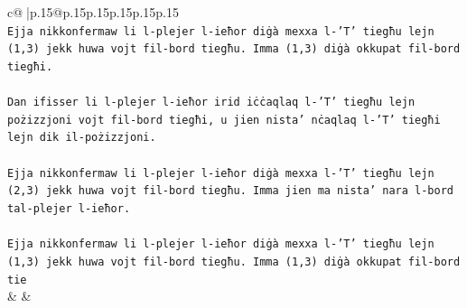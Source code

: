 \documentclass{article}
\begin{document}
{\begin{supertabular}{c@{$\;$}|p{.15\linewidth}@{}p{.15\linewidth}p{.15\linewidth}p{.15\linewidth}p{.15\linewidth}p{.15\linewidth}}
{{{\\ 
\texttt{Ejja nikkonfermaw li l{-}plejer l{-}ieħor diġà mexxa l{-}'T' tiegħu lejn (1,3) jekk huwa vojt fil{-}bord tiegħu. Imma (1,3) diġà okkupat fil{-}bord tiegħi.} \\
\\ 
\texttt{Dan ifisser li l{-}plejer l{-}ieħor irid iċċaqlaq l{-}'T' tiegħu lejn pożizzjoni vojt fil{-}bord tiegħi, u jien nista' nċaqlaq l{-}'T' tiegħi lejn dik il{-}pożizzjoni.} \\
\\ 
\texttt{Ejja nikkonfermaw li l{-}plejer l{-}ieħor diġà mexxa l{-}'T' tiegħu lejn (2,3) jekk huwa vojt fil{-}bord tiegħu. Imma jien ma nista' nara l{-}bord tal{-}plejer l{-}ieħor.} \\
\\ 
\texttt{Ejja nikkonfermaw li l{-}plejer l{-}ieħor diġà mexxa l{-}'T' tiegħu lejn (1,3) jekk huwa vojt fil{-}bord tiegħu. Imma (1,3) diġà okkupat fil{-}bord tie} \\
            }
        }
    }
    & & \\ \\


\end{supertabular}}
\end{document}
